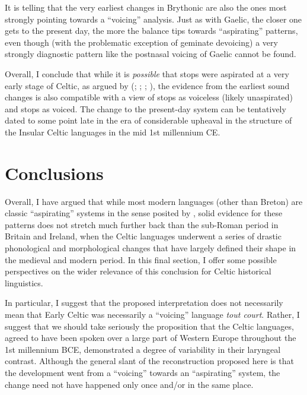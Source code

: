 \documentclass[output=paper,colorlinks,citecolor=brown]{langscibook}
\begin{document}
It is telling that the very earliest changes in Brythonic are also the ones most strongly pointing towards a \enquote{voicing} analysis. Just as with Gaelic, the closer one gets to the present day, the more the balance tips towards \enquote{aspirating} patterns, even though (with the problematic exception of geminate devoicing) a very strongly diagnostic pattern like the postnasal voicing of Gaelic cannot be found.

Overall, I conclude that while it is \emph{possible} that  stops were aspirated at a very early stage of Celtic, as argued by \citeauthor{eska2017} (\citeyear{eska2017}; \citeyear{Eska2018}; \citeyear {eska2019laryngeal}; \citeyear{eska2020interarticulatory}), the evidence from the earliest sound changes is also compatible with a view of  stops as voiceless (likely unaspirated) and  stops as voiced. The change to the present\hyp day system can be tentatively dated to some point late in the era of considerable upheaval in the structure of the Insular Celtic languages in the mid 1st millennium CE.

\section{Conclusions}
\label{sec:conclusion}

Overall, I have argued that while most modern languages (other than Breton) are classic \enquote{aspirating} systems in the sense posited by  \parencite[in agreement with][]{Eska2018}, solid evidence for these patterns does not stretch much further back than the sub\hyp Roman period in Britain and Ireland, when the Celtic languages underwent a series of drastic phonological and morphological changes that have largely defined their shape in the medieval and modern period. In this final section, I offer some possible perspectives on the wider relevance of this conclusion for Celtic historical linguistics.

In particular, I suggest that the proposed interpretation does not necessarily mean that Early Celtic was necessarily a \enquote{voicing} language \emph{tout court}. Rather, I suggest that we should take seriously the proposition that the Celtic languages, agreed to have been spoken over a large part of Western Europe throughout the 1st millennium BCE, demonstrated a degree of variability in their laryngeal contrast. Although the general slant of the reconstruction proposed here is that the development went from a \enquote{voicing} towards an \enquote{aspirating} system, the change need not have happened only once and/or in the same place.
\end{document}
